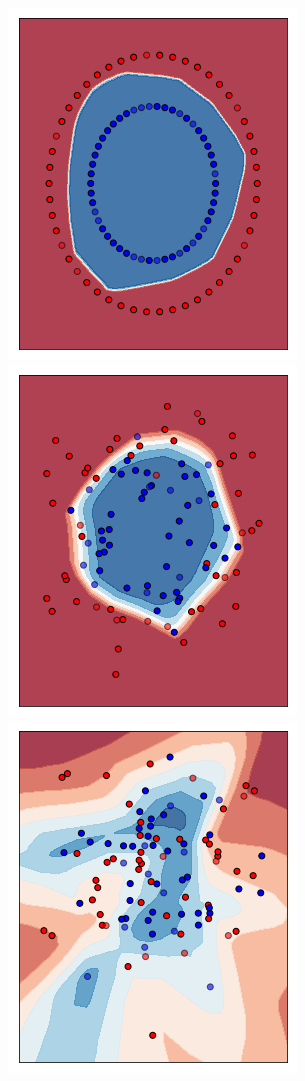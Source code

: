 \documentclass[12pt,a4paper]{report}
\begin{document}
\begin{figure}[H]
 \centering
 \includegraphics[scale = 0.35]{images/circles-noise0.png}
 \includegraphics[scale = 0.35]{images/circles-noise0,2.png}
 \includegraphics[scale = 0.35]{images/circles-noise0,6.png}

\end{figure}
\end{document}
